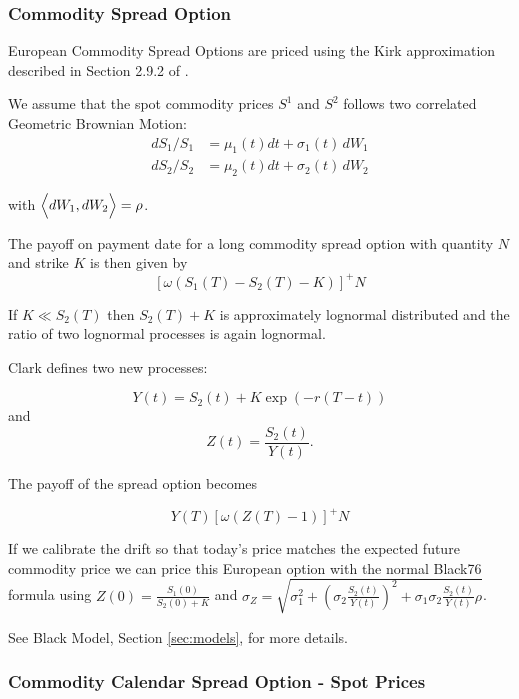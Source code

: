 \subsubsection{Commodity Spread Option}
\label{pricing:com_spread_option}

European Commodity Spread Options are priced using the Kirk approximation described in Section 2.9.2 of \cite{Clark_2014}.

We assume that the spot commodity prices $S^1$ and $S^2$ follows two correlated Geometric 
Brownian Motion:
\begin{align*}
dS_1/S_1 &= \mu_1(t)dt + \sigma_1(t)\,dW_1 \\
dS_2/S_2 &= \mu_2(t)dt + \sigma_2(t)\,dW_2
\end{align*}

with $\Bigl \langle dW_1, dW_2 \Bigr \rangle = \rho$.

The payoff on payment date for a long commodity spread option with quantity $N$ and strike $K$ is then given by
\begin{equation}
\left[ \omega \left( S_1(T) - S_2(T) - K \right) \right]^{+} N
\end{equation}

If $K \ll S_2(T)$ then  $S_2(T) + K$ is approximately lognormal distributed and the ratio of two lognormal processes is again lognormal.

Clark defines two new processes: 

$$ Y(t) = S_2(t) + K \exp(-r(T-t))$$ and
$$ Z(t) = \frac{S_2(t)}{Y(t)}.$$

The payoff of the spread option becomes

\begin{equation}
Y(T) \left[ \omega  \left( Z(T) - 1 \right) \right]^{+} N
\end{equation}

If we calibrate the drift so that today's price matches the expected future commodity price we can price this European option with the normal Black76 formula using $Z(0)=\frac{S_1(0)}{S_2(0)+K}$ and $\sigma_Z = \sqrt{\sigma_1^2 + (\sigma_2 \frac{S_2(t)}{Y(t)})^2  + \sigma_1 \sigma_2 \frac{S_2(t)}{Y(t)} \rho }$.

See Black Model, Section \ref{sec:models}, for more details.

\subsubsection{Commodity Calendar Spread Option - Spot Prices}
\label{pricing:com_calendar_spread_option}

